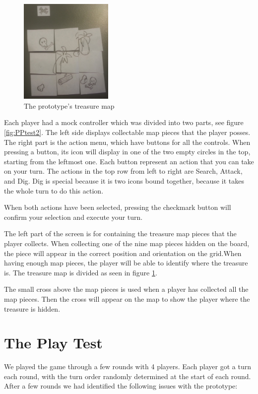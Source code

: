 \begin{figure}
\begin{center}
\includegraphics[width=0.4\textwidth]{figures/PPtestMap} 
\end{center}
\caption{The prototype's treasure map}\label{fig:PPtest3}
\end{figure}

Each player had a mock controller which was divided into two parts, see figure \ref{fig:PPtest2}. The left side displays collectable map pieces that the player posses. The right part is the action menu, which have buttons for all the controls. When pressing a button, its icon will display in one of the two empty circles in the top, starting from the leftmost one. Each button represent an action that you can take on your turn. The actions in the top row from left to right are Search, Attack, and Dig. Dig is special because it is two icons bound together, because it takes the whole turn to do this action.

When both actions have been selected, pressing the checkmark button will confirm your selection and execute your turn.

The left part of the screen is for containing the treasure map pieces that the player collects. When collecting one of the nine map pieces hidden on the board, the piece will appear in the correct position and orientation on the grid.When having enough map pieces, the player will be able to identify where the treasure is. The treasure map is divided as seen in figure \ref{fig:PPtest3}.

The small cross above the map pieces is used when a player has collected all the map pieces. Then the cross will appear on the map to show the player where the treasure is hidden.

\section{The Play Test}
We played the game through a few rounds with 4 players. Each player got a turn each round, with the turn order randomly determined at the start of each round.  After a few rounds we had identified the following issues with the prototype:

